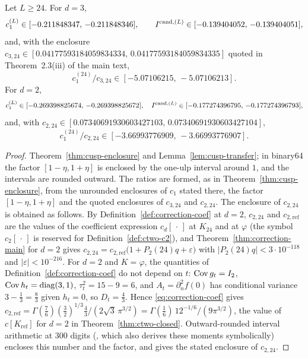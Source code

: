 \begin{corollary}\label{cor:cusp-torus}
Let $L\ge24$. For $d=3$,
\[
c_1^{(L)}\in[-0.211848347,\,-0.211848346],\qquad I^{\mathrm{cand},(L)}\in[-0.139404052,\,-0.139404051],
\]
and, with the enclosure $c_{3,24}\in[0.04177593184059834334,\,0.04177593184059834335]$ quoted in Theorem~2.3(iii) of the main text,
\[
c_1^{(24)}/c_{3,24}\in[-5.07106215,\,-5.07106213].
\]
For $d=2$,
\[
c_1^{(L)}\in[-0.269398825674,\,-0.269398825672],\quad I^{\mathrm{cand},(L)}\in[-0.177274396795,\,-0.177274396793],
\]
and, with $c_{2,24}\in[0.07340691930603427103,\,0.07340691930603427104]$,
\[
c_1^{(24)}/c_{2,24}\in[-3.66993776909,\,-3.66993776907].
\]
\end{corollary}

\begin{proof}
Theorem~\ref{thm:cusp-enclosure} and Lemma~\ref{lem:cusp-transfer}; in binary64 the factor $[1-\eta,1+\eta]$ is enclosed by the one-ulp interval around $1$, and the intervals are rounded outward. The ratios are formed, as in Theorem~\ref{thm:cusp-enclosure}, from the unrounded enclosures of $c_1$ stated there, the factor $[1-\eta,1+\eta]$ and the quoted enclosures of $c_{3,24}$ and $c_{2,24}$. The enclosure of $c_{2,24}$ is obtained as follows. By Definition~\ref{def:correction-coef} at $d=2$, $c_{2,24}$ and $c_{2,\mathrm{ref}}$ are the values of the coefficient expression $c_d[\,\cdot\,]$ at $K_{24}$ and at $\varphi$ (the symbol $c_2[\,\cdot\,]$ is reserved for Definition~\ref{def:ctwo-c2}), and Theorem~\ref{thm:correction-main} for $d=2$ gives $c_{2,24}=c_{2,\mathrm{ref}}\bigl(1+P_2(24)q+\varepsilon\bigr)$ with $|P_2(24)q|<3\cdot10^{-118}$ and $|\varepsilon|<10^{-216}$. For $d=2$ and $K=\varphi$, the quantities of Definition~\ref{def:correction-coef} do not depend on $t$: $\operatorname{Cov} g_t=I_2$, $\operatorname{Cov} h_t=\mathrm{diag}(3,1)$, $\tau_t^2=15-9=6$, and $A_t=\partial_n^2f(0)$ has conditional variance $3-\frac13=\frac83$ given $h_t=0$, so $D_t=\frac43$. Hence \eqref{eq:correction-coef} gives $c_{2,\mathrm{ref}}=\Gamma(\frac76)(\frac32)^{1/3}\frac43/(2\sqrt3\,\pi^{3/2})=\Gamma(\frac16)\,12^{-1/6}/(9\pi^{3/2})$, the value of $c[K_{\mathrm{ref}}]$ for $d=2$ in Theorem~\ref{thm:ctwo-closed}. Outward-rounded interval arithmetic at $300$ digits (, which also derives these moments symbolically) encloses this number and the factor, and gives the stated enclosure of $c_{2,24}$.
\end{proof}

